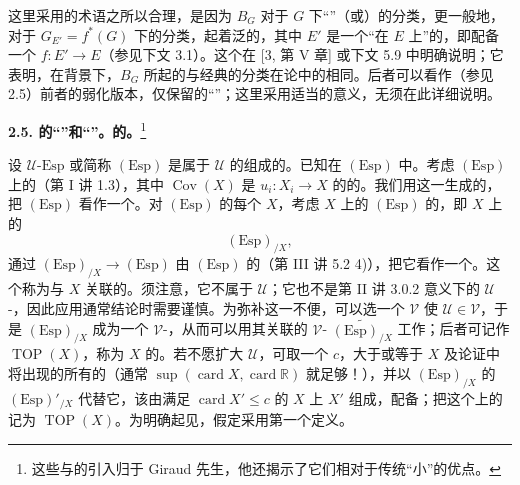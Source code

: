 这里采用的术语之所以合理，是因为 $B_G$ 对于 $G$ 下“”（或）的分类，更一般地，对于 $G_{E'}=f^*(G)$ 下的分类，起着泛的，其中 $E'$ 是一个“在 $E$ 上”的，即配备一个 $f:E'\to E$（参见下文 3.1）。这个在 [3, 第 V 章] 或下文 5.9 中明确说明；它表明，在背景下，$B_G$ 所起的与经典的分类在论中的相同。后者可以看作（参见 2.5）前者的弱化版本，仅保留的“”；这里采用适当的意义，无须在此详细说明。

\textbf{2.5. 的“”和“”。的。}\footnote{这些与的引入归于 Giraud 先生，他还揭示了它们相对于传统“小”的优点。}

设 $\mathcal U\text{-}\mathrm{Esp}$ 或简称 $(\mathrm{Esp})$ 是属于 $\mathcal U$ 的组成的。已知在 $(\mathrm{Esp})$ 中。考虑 $(\mathrm{Esp})$ 上的（第 I 讲 1.3），其中 $\operatorname{Cov}(X)$ 是 $u_i:X_i\to X$ 的的。我们用这一生成的，把 $(\mathrm{Esp})$ 看作一个。对 $(\mathrm{Esp})$ 的每个 $X$，考虑 $X$ 上的 $(\mathrm{Esp})$ 的，即 $X$ 上的
\[
 (\mathrm{Esp})_{/X},
\]
通过 $(\mathrm{Esp})_{/X}\to(\mathrm{Esp})$ 由 $(\mathrm{Esp})$ 的（第 III 讲 5.2 4)），把它看作一个。这个称为与 $X$ 关联的。须注意，它不属于 $\mathcal U$；它也不是第 II 讲 3.0.2 意义下的 $\mathcal U$-，因此应用通常结论时需要谨慎。为弥补这一不便，可以选一个 $\mathcal V$ 使 $\mathcal U\in\mathcal V$，于是 $(\mathrm{Esp})_{/X}$ 成为一个 $\mathcal V$-，从而可以用其关联的 $\mathcal V$- $\widetilde{(\mathrm{Esp})_{/X}}$ 工作；后者可记作 $\operatorname{TOP}(X)$，称为 $X$ 的。若不愿扩大 $\mathcal U$，可取一个 $c$，大于或等于 $X$ 及论证中将出现的所有的（通常 $\sup(\operatorname{card}X,\operatorname{card}\mathbb R)$ 就足够！），并以 $(\mathrm{Esp})_{/X}$ 的 $(\mathrm{Esp})'_{/X}$ 代替它，该由满足 $\operatorname{card}X'\leq c$ 的 $X$ 上 $X'$ 组成，配备；把这个上的记为 $\operatorname{TOP}(X)$。为明确起见，假定采用第一个定义。

